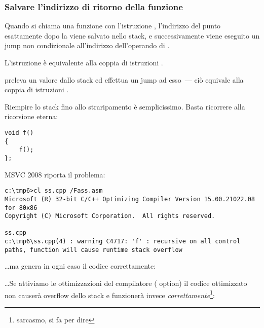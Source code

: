 \subsubsection{Salvare l'indirizzo di ritorno della funzione}


Quando si chiama una funzione con l'istruzione \CALL, l'indirizzo del punto esattamente dopo la \CALL viene salvato nello stack, e successivamente
viene eseguito un jump non condizionale all'indirizzo dell'operando di \CALL.

L'istruzione \CALL è equivalente alla coppia di istruzioni .

\RET preleva un valore dallo stack ed effettua un jump ad esso~--- ciò equivale alla coppia di istruzioni .

\myindex{\Stack!\MLStackOverflow}
\myindex{\Recursion}

Riempire lo stack fino allo straripamento è semplicissimo. Basta ricorrere alla ricorsione eterna:

\begin{lstlisting}[style=customc]
void f()
{
	f();
};
\end{lstlisting}

MSVC 2008 riporta il problema:

\begin{lstlisting}
c:\tmp6>cl ss.cpp /Fass.asm
Microsoft (R) 32-bit C/C++ Optimizing Compiler Version 15.00.21022.08 for 80x86
Copyright (C) Microsoft Corporation.  All rights reserved.

ss.cpp
c:\tmp6\ss.cpp(4) : warning C4717: 'f' : recursive on all control paths, function will cause runtime stack overflow
\end{lstlisting}

\dots ma genera in ogni caso il codice correttamente:



\dots Se attiviamo le ottimizzazioni del compilatore (\TT{\Ox} option) il codice ottimizzato non causerà overflow dello stack
e funzionerà invece \emph{correttamente}\footnote{sarcasmo, si fa per dire}:



